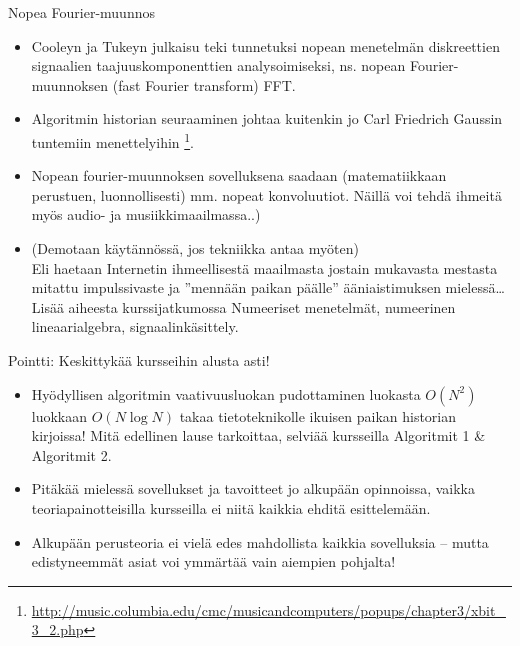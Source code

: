 \documentclass[pdf,handout,10pt]{beamer}
\begin{document}
\begin{frame}{Nopea Fourier-muunnos}
\begin{itemize}
\item
  Cooleyn ja Tukeyn julkaisu \cite{CooleyTukey1965fft} teki tunnetuksi
  nopean menetelmän diskreettien signaalien taajuuskomponenttien
  analysoimiseksi, ns. nopean Fourier-muunnoksen (fast Fourier transform)
  FFT.
\item
  Algoritmin historian seuraaminen johtaa kuitenkin jo Carl
  Friedrich Gaussin tuntemiin menettelyihin
  \footnote{\url{http://music.columbia.edu/cmc/musicandcomputers/popups/chapter3/xbit_3_2.php}}.
\item
  Nopean fourier-muunnoksen sovelluksena saadaan (matematiikkaan
  perustuen, luonnollisesti) mm. nopeat konvoluutiot. Näillä voi tehdä
  ihmeitä myös audio- ja musiikkimaailmassa..)
\item[] (Demotaan käytännössä, jos tekniikka antaa myöten)\\ Eli
  haetaan Internetin ihmeellisestä maailmasta jostain mukavasta
  mestasta mitattu impulssivaste ja ''mennään paikan päälle'' ääniaistimuksen
  mielessä\ldots Lisää aiheesta kurssijatkumossa Numeeriset
  menetelmät, numeerinen lineaarialgebra, signaalinkäsittely.
\end{itemize}
\end{frame}


\begin{frame}{Pointti: Keskittykää kursseihin alusta asti!}
\begin{itemize}
\item
  Hyödyllisen algoritmin vaativuusluokan pudottaminen luokasta
  $O(N^2)$ luokkaan $O(N \mathop{log} N)$ takaa tietoteknikolle
  ikuisen paikan historian kirjoissa! Mitä edellinen lause tarkoittaa,
  selviää kursseilla Algoritmit 1 \& Algoritmit 2.
\item
  Pitäkää mielessä sovellukset ja tavoitteet jo alkupään opinnoissa,
  vaikka teoriapainotteisilla kursseilla ei niitä kaikkia ehditä
  esittelemään.
\item Alkupään perusteoria ei vielä edes mahdollista kaikkia
  sovelluksia -- mutta edistyneemmät asiat voi ymmärtää vain aiempien
  pohjalta!
\end{itemize}
\end{frame}
\end{document}

